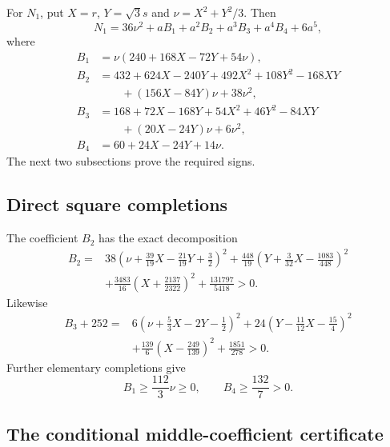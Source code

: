 \documentclass[10pt,twoside]{siamart1116}
\begin{document}
For $N_1$, put $X=r$, $Y=\sqrt3s$ and
$\nu=X^2+Y^2/3$.  Then
\begin{equation}\label{eq:N1-B}
 N_1=36\nu^2+aB_1+a^2B_2+a^3B_3+a^4B_4+6a^5,
\end{equation}
where
\begin{align*}
 B_1&=\nu(240+168X-72Y+54\nu),\\
 B_2&=432+624X-240Y+492X^2+108Y^2-168XY\\
    &\qquad +(156X-84Y)\nu+38\nu^2,\\
 B_3&=168+72X-168Y+54X^2+46Y^2-84XY\\
    &\qquad +(20X-24Y)\nu+6\nu^2,\\
 B_4&=60+24X-24Y+14\nu.
\end{align*}
The next two subsections prove the required signs.

\subsection{Direct square completions}\label{app:direct-completions}

The coefficient $B_2$ has the exact decomposition
\begin{align*}
 B_2={}&38\left(\nu+\frac{39}{19}X-\frac{21}{19}Y+\frac32\right)^2
 +\frac{448}{19}\left(Y+\frac3{32}X-\frac{1083}{448}\right)^2\\
 &+\frac{3483}{16}\left(X+\frac{2137}{2322}\right)^2
 +\frac{131797}{5418}>0.
\end{align*}
Likewise
\begin{align*}
 B_3+252={}&6\left(\nu+\frac53X-2Y-\frac12\right)^2
 +24\left(Y-\frac{11}{12}X-\frac{15}{4}\right)^2\\
 &+\frac{139}{6}\left(X-\frac{249}{139}\right)^2
 +\frac{1851}{278}>0.
\end{align*}
Further elementary completions give
\[
 B_1\geq\frac{112}{3}\nu\geq0,\qquad
 B_4\geq\frac{132}{7}>0.
\]

\subsection{The conditional middle-coefficient certificate}
\label{app:conditional-certificate}
\end{document}

